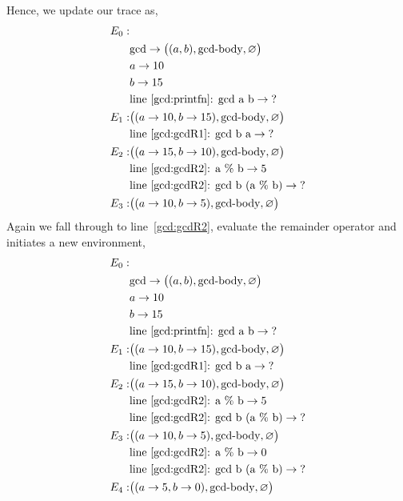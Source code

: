 Hence, we update our trace as,
\begin{align*}
  E_0:&\\
      & \text{gcd} \rightarrow \big((a, b), \text{gcd-body}, \varnothing\big)\\
      & a \rightarrow 10\\
      & b \rightarrow 15\\
      & \text{line~\ref{gcd:printfn}: gcd a b} \rightarrow \text{?}\\
  E_1:& \big((a \rightarrow 10, b \rightarrow 15), \text{gcd-body}, \varnothing\big)\\
      & \text{line~\ref{gcd:gcdR1}: gcd b a} \rightarrow \text{?}\\
  E_2:& \big((a \rightarrow 15, b \rightarrow 10), \text{gcd-body}, \varnothing\big)\\
      & \text{line~\ref{gcd:gcdR2}: a \% b} \rightarrow 5\\
      & \text{line~\ref{gcd:gcdR2}: gcd b (a \% b)} \rightarrow \text{?}\\
  E_3:& \big((a \rightarrow 10, b \rightarrow 5), \text{gcd-body}, \varnothing\big)\\
\end{align*}
Again we fall through to line~\ref{gcd:gcdR2}, evaluate the remainder operator and initiates a new environment,
\begin{align*}
  E_0:&\\
      & \text{gcd} \rightarrow \big((a, b), \text{gcd-body}, \varnothing\big)\\
      & a \rightarrow 10\\
      & b \rightarrow 15\\
      & \text{line~\ref{gcd:printfn}: gcd a b} \rightarrow \text{?}\\
  E_1:& \big((a \rightarrow 10, b \rightarrow 15), \text{gcd-body}, \varnothing\big)\\
      & \text{line~\ref{gcd:gcdR1}: gcd b a} \rightarrow \text{?}\\
  E_2:& \big((a \rightarrow 15, b \rightarrow 10), \text{gcd-body}, \varnothing\big)\\
      & \text{line~\ref{gcd:gcdR2}: a \% b} \rightarrow 5\\
      & \text{line~\ref{gcd:gcdR2}: gcd b (a \% b)} \rightarrow \text{?}\\
  E_3:& \big((a \rightarrow 10, b \rightarrow 5), \text{gcd-body}, \varnothing\big)\\
      & \text{line~\ref{gcd:gcdR2}: a \% b} \rightarrow 0\\
      & \text{line~\ref{gcd:gcdR2}: gcd b (a \% b)} \rightarrow \text{?}\\
  E_4:& \big((a \rightarrow 5, b \rightarrow 0), \text{gcd-body}, \varnothing\big)\\
\end{align*}
